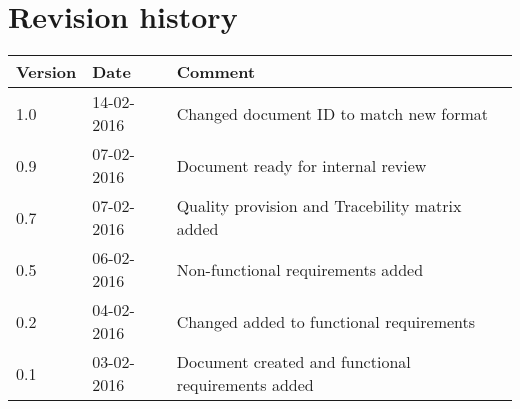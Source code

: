 \label{chp_revisionHistory}
\chapter{Revision history}

\begin{longtable}{| p{1.5cm}  | p{3cm} |  p{8cm} | }
	\hline
	\textbf{Version} & \textbf{Date} & \textbf{Comment} \\
    \hline
    1.0 & 14-02-2016 & Changed document ID to match new format \\
    \hline
    0.9 & 07-02-2016 & Document ready for internal review \\
	\hline
    0.7 & 07-02-2016 & Quality provision and Tracebility matrix added \\
    \hline
   	0.5 & 06-02-2016 & Non-functional requirements added \\
    \hline
	0.2 & 04-02-2016 & Changed added to functional requirements \\
	\hline
    0.1 & 03-02-2016 & Document created and functional requirements added  \\
	\hline
\end{longtable}

